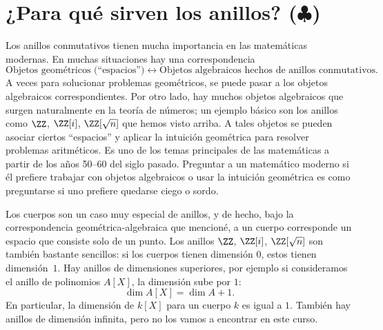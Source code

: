 
\section{¿Para qué sirven los anillos? ($\clubsuit$)}

Los anillos conmutativos tienen mucha importancia en las matemáticas
modernas. En muchas situaciones hay una correspondencia
$$\text{Objetos geométricos (``espacios'')} \longleftrightarrow \text{Objetos algebraicos hechos de anillos conmutativos}.$$
A veces para solucionar problemas geométricos, se puede pasar a los objetos
algebraicos correspondientes. Por otro lado, hay muchos objetos algebraicos que
surgen naturalmente en la teoría de números; un ejemplo básico son los anillos
como $\ZZ$, $\ZZ [i]$, $\ZZ [\sqrt{n}]$ que hemos visto arriba. A tales objetos
se pueden asociar ciertos ``espacios'' y aplicar la intuición geométrica para
resolver problemas aritméticos. Es uno de los temas principales de las
matemáticas a partir de los años 50--60 del siglo pasado. Preguntar a un
matemático moderno si él prefiere trabajar con objetos algebraicos o usar la
intuición geométrica es como preguntarse si uno prefiere quedarse ciego o sordo.

\vspace{1em}

Los cuerpos son un caso muy especial de anillos, y de hecho, bajo la
correspondencia geométrica-algebraica que mencioné, a un cuerpo corresponde un
espacio que consiste solo de un punto. Los anillos $\ZZ$, $\ZZ [i]$,
$\ZZ [\sqrt{n}]$ son también bastante sencillos: si los cuerpos tienen dimensión
$0$, estos tienen dimensión~$1$. Hay anillos de dimensiones superiores, por
ejemplo si consideramos el anillo de polinomios $A [X]$, la dimensión sube por
$1$:
$$\dim A [X] = \dim A + 1.$$
En particular, la dimensión de $k [X]$ para un cuerpo $k$ es igual a
$1$. También hay anillos de dimensión infinita, pero no los vamos a encontrar en
este curso.
